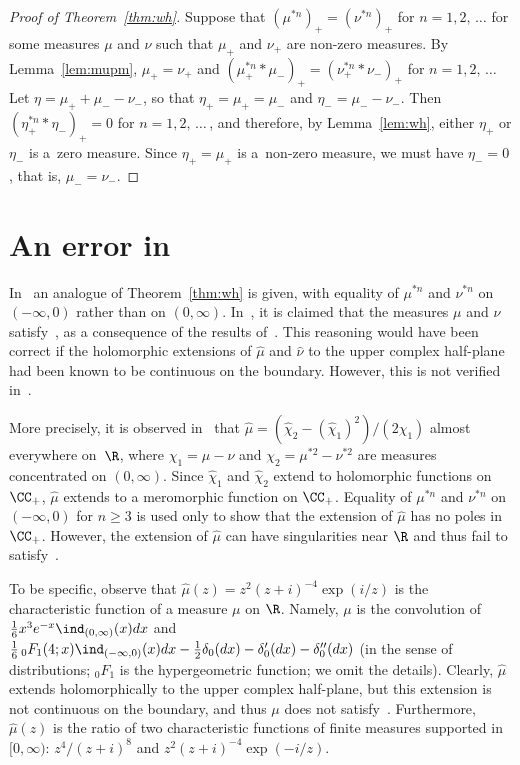 \begin{proof}[Proof of Theorem~\ref{thm:wh}]
Suppose that $(\mu^{*n})_+ = (\nu^{*n})_+$ for $n = 1, 2,\,\ldots$ for some measures $\mu$ and $\nu$ such that $\mu_+$ and $\nu_+$ are non-zero measures. By Lemma~\ref{lem:mupm}, $\mu_+ = \nu_+$ and $(\mu_+^{*n} * \mu_-)_+ = (\nu_+^{*n} * \nu_-)_+$ for $n = 1, 2,\,\ldots\,$Let $\eta = \mu_+ + \mu_- - \nu_-$, so that $\eta_+ = \mu_+ = \mu_-$ and $\eta_- = \mu_- - \nu_-$. Then $(\eta_+^{*n} * \eta_-)_+ = 0$ for $n = 1, 2,\,\ldots\,$, and therefore, by Lemma~\ref{lem:wh}, either $\eta_+$ or $\eta_-$ is a~zero measure. Since $\eta_+ = \mu_+$ is a~non-zero measure, we must have $\eta_- = 0$, that is, $\mu_- = \nu_-$.
\end{proof}


\section{An error in~\cite{bib:u94}}

In~\cite{bib:u94} an analogue of Theorem~\ref{thm:wh} is given, with equality of $\mu^{*n}$ and $\nu^{*n}$ on $(-\infty, 0)$ rather than on $(0, \infty)$. In~\cite[Page~3001, line~16]{bib:u94}, it is claimed that the measures $\mu$ and $\nu$ satisfy~\cite[condition~(B) of Theorem~A]{bib:u94}, as a consequence of the results of~\cite[Section~11.2]{bib:lo77}. This reasoning would have been correct if the holomorphic extensions of $\hat{\mu}$ and $\hat{\nu}$ to the upper complex half-plane had been known to be continuous on the boundary. However, this is not verified in~\cite{bib:u94}.

More precisely, it is observed in~\cite{bib:u94} that $\hat{\mu} = (\hat{\chi}_2 - (\hat{\chi}_1)^2) / (2 \hat{\chi}_1)$ almost everywhere on~$\R$, where $\chi_1 = \mu - \nu$ and $\chi_2 = \mu^{*2} - \nu^{*2}$ are measures concentrated on $(0, \infty)$. Since $\hat{\chi}_1$ and $\hat{\chi}_2$ extend to holomorphic functions on $\CC_+$, $\hat{\mu}$ extends to a meromorphic function on $\CC_+$. Equality of $\mu^{*n}$ and $\nu^{*n}$ on $(-\infty, 0)$ for $n \ge 3$ is used only to show that the extension of $\hat{\mu}$ has no poles in $\CC_+$. However, the extension of $\hat{\mu}$ can have singularities near $\R$ and thus fail to satisfy~\cite[condition~(B) of Theorem~A]{bib:u94}.

To be specific, observe that $\hat{\mu}(z) = z^2 (z + i)^{-4} \exp(i/z)$ is the characteristic function of a measure $\mu$ on $\R$. Namely, $\mu$ is the convolution of $\tfrac{1}{6} x^3 e^{-x} \ind_{(0, \infty)}(x) dx$ and $\tfrac{1}{6} \, {_0F_1}(4; x) \ind_{(-\infty, 0)}(x) dx - \tfrac{1}{2} \delta_0(dx) - \delta_0'(dx) - \delta_0''(dx)$ (in the sense of distributions; ${_0F_1}$ is the hypergeometric function; we omit the details). Clearly, $\hat{\mu}$ extends holomorphically to the upper complex half-plane, but this extension is not continuous on the boundary, and thus $\mu$ does not satisfy~\cite[condition~(B) of Theorem~A]{bib:u94}. Furthermore, $\hat{\mu}(z)$ is the ratio of two characteristic functions of finite measures supported in $[0, \infty)$: $z^4 / (z + i)^8$ and $z^2 (z + i)^{-4} \exp(-i/z)$.

